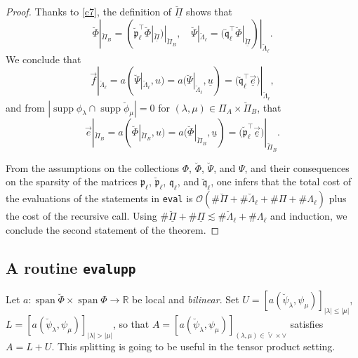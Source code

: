 \documentclass{amsart}
\theoremstyle{definition}
\theoremstyle{remark}
\numberwithin{equation}{section}
\newcommand{\R}{\mathbb R}
\DeclareMathOperator{\supp}{supp}
\DeclareMathOperator{\Span}{span}
\newcommand{\1}{\mathbb 1}
\begin{document}
\begin{proof}
Thanks to \eqref{c7}, the definition of $\breve{\underline{\Pi}}$ shows that
$$
 \breve{\Phi}|_{\breve{\Pi}_B}=(\breve{\mathfrak{p}}_{\ell} ^\top \breve{\Phi}|_{\underline{\breve{\Pi}}})|_{\breve{\Pi}_B},\quad \breve{\Psi}|_{\breve{\Lambda}_\ell}=(\mathfrak{\breve{q}}_\ell^\top \breve{\Phi}|_{\underline{\breve{\Pi}}})|_{\breve{\Lambda}_\ell}.
 $$
We conclude that 
 $$
  \vec{f}|_{\breve{\Lambda}_\ell}= a(\breve{\Psi}|_{\breve{\Lambda}_\ell}, u) =a(\breve{\Psi}|_{\breve{\Lambda}_\ell}, \underline{u})=
   \big(\mathfrak{\breve{q}}_\ell^\top \underline{\vec{e}}\big)|_{\breve{\Lambda}_\ell},
 $$ 
 and from $|\supp \phi_\lambda \cap \supp \breve{\phi}_\mu|=0$ for $(\lambda,\mu) \in \Pi_A \times\breve{\Pi}_B$, that
$$
 \vec{e}|_{\breve{\Pi}_B}=  a(\breve{\Phi}|_{\breve{\Pi}_B}, u)= a(\breve{\Phi}|_{\breve{\Pi}_B}, \underline{u})=   \big(\breve{\mathfrak{p}}_{\ell} ^\top \underline{\vec{e}}\big)|_{\breve{\Pi}_B}.
$$
 
 From the assumptions on the collections $\Phi$, $\breve{\Phi}$, $\breve{\Psi}$, and $\Psi$, and their consequences on the sparsity of the matrices $\mathfrak{p}_{\ell} $, $\breve{\mathfrak{p}}_{\ell}$, $\mathfrak{q}_\ell$, and $\mathfrak{\breve{q}}_\ell$, one infers that the total cost of the evaluations of the statements in \texttt{eval} is ${\mathcal O}(\# \breve{\Pi}+\# \breve{\Lambda}_\ell+\# \Pi+\# \Lambda_\ell)$ plus the cost of the recursive call. Using 
 $ \# \breve{\underline{\Pi}} + \# \underline{\Pi} \lesssim \# \breve{\Lambda}_\ell+\# \Lambda_\ell$
 and induction, we conclude the second statement of the theorem.
 \end{proof}
 
  



 \newpage
 \subsection{A routine \texttt{evalupp} } \mbox{}
 
Let $a\colon \Span \breve{\Phi} \times \Span \Phi \rightarrow \R$ be local and {\em bilinear}.
Set $U=[a(\breve{\psi}_\lambda,\psi_\mu)]_{|\lambda| \leq |\mu|}$, $L=[a(\breve{\psi}_\lambda,\psi_\mu)]_{|\lambda| > |\mu|}$, so that $A=[a(\breve{\psi}_\lambda,\psi_\mu)]_{(\lambda,\mu) \in \breve{\vee}\times \vee}$ satisfies $A=L+U$. This splitting is going to be useful in the tensor product setting. \bigskip
\end{document}
